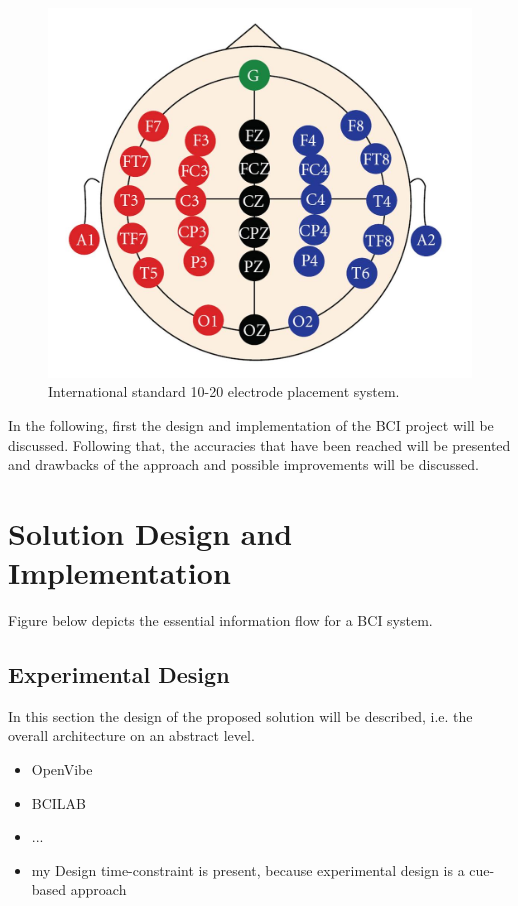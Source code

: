 \documentclass[a4paper,twoside, openright,12pt]{report}
\begin{document}
\begin{figure}[h]
	\centering
	\includegraphics[width=0.5\linewidth]{./gfx/10-20.jpg}
	\caption{International standard 10-20 electrode placement system.}
	\label{fig:10-20-system}
\end{figure}



In the following, first the design and implementation of the BCI project will be discussed. Following that, the accuracies that have been reached will be presented and drawbacks of the approach and possible improvements will be discussed.







\chapter{Solution Design and Implementation}
Figure below depicts the essential information flow for a BCI system. 




\section{Experimental Design}
In this section the design of the proposed solution will be described, i.e. the overall architecture on an abstract level. 

\begin{itemize}
	\item OpenVibe
	\item BCILAB
	\item ... 
	\item my Design
	\subitem time-constraint is present, because experimental design is a cue-based approach
\end{itemize}
\end{document}
